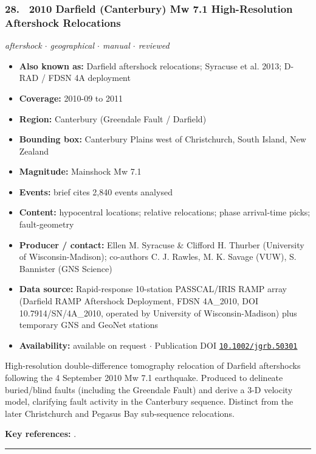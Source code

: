 \documentclass[10pt,a4paper]{article}
\newcommand{\catentryrule}{\par\vspace{3pt}\noindent\textcolor{rulegrey}{\rule{\linewidth}{0.3pt}}\par\vspace{5pt}}
\newcommand{\kv}[2]{\item \textbf{#1:} #2}
\begin{document}
\subsubsection*{\hypertarget{c:28}{28.}~ 2010 Darfield (Canterbury) Mw 7.1 High-Resolution Aftershock Relocations}
{\small\itshape aftershock $\cdot$ geographical $\cdot$ manual $\cdot$ reviewed}\par\vspace{2pt}
\begin{itemize}[leftmargin=1.3em,itemsep=0.6pt,topsep=1pt,parsep=0pt]
\kv{Also known as}{Darfield aftershock relocations; Syracuse et al. 2013; D-RAD / FDSN 4A deployment}
\kv{Coverage}{2010-09 to 2011}
\kv{Region}{Canterbury (Greendale Fault / Darfield)}
\kv{Bounding box}{Canterbury Plains west of Christchurch, South Island, New Zealand}
\kv{Magnitude}{Mainshock Mw 7.1}
\kv{Events}{brief cites 2,840 events analysed}
\kv{Content}{hypocentral locations; relative relocations; phase arrival-time picks; fault-geometry}
\kv{Producer / contact}{Ellen M. Syracuse \& Clifford H. Thurber (University of Wisconsin-Madison); co-authors C. J. Rawles, M. K. Savage (VUW), S. Bannister (GNS Science)}
\kv{Data source}{Rapid-response 10-station PASSCAL/IRIS RAMP array (Darfield RAMP Aftershock Deployment, FDSN 4A\_2010, DOI 10.7914/SN/4A\_2010, operated by University of Wisconsin-Madison) plus temporary GNS and GeoNet stations}
\kv{Availability}{available on request $\cdot$ Publication DOI \href{https://doi.org/10.1002/jgrb.50301}{\nolinkurl{10.1002/jgrb.50301}}}
\end{itemize}
\par\vspace{2pt}High-resolution double-difference tomography relocation of Darfield aftershocks following the 4 September 2010 Mw 7.1 earthquake. Produced to delineate buried/blind faults (including the Greendale Fault) and derive a 3-D velocity model, clarifying fault activity in the Canterbury sequence. Distinct from the later Christchurch and Pegasus Bay sub-sequence relocations.
\par\vspace{2pt}\textbf{Key references:} \cite{Syracuse2013,DarfieldRAMPAftershockDeploymentDRAD2010}.
\catentryrule
\end{document}
